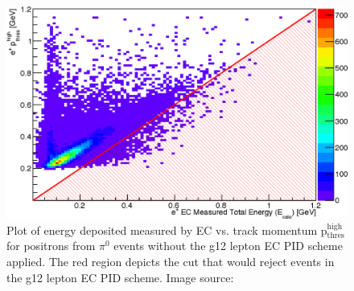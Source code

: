 \begin{figure}\begin{center}
											\includegraphics[width=0.8\figwidth]{figures/lepton/Pip_EChighcut.eps}
											\caption[EC Deposited Energy Comparison to Track Momentum for $e^+$ from $\pi^0$ Events]{\label{fig:islep.pipECcut}Plot of energy deposited measured by EC vs. track momentum p$\mathrm{_{thres}^{high}}$ for positrons from $\pi^0$ events without the g12 lepton EC PID scheme applied. The red region depicts the cut that would reject events in the g12 lepton EC PID scheme. Image source:~\cite{thesiskunkel}}
\end{center}\end{figure}																											
\FloatBarrier

